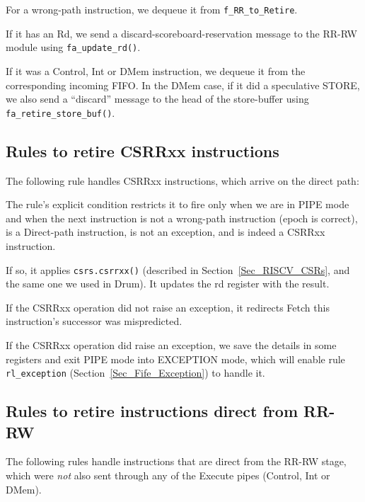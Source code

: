 For a wrong-path instruction, we dequeue it from \verb|f_RR_to_Retire|.

If it has an Rd, we send a discard-scoreboard-reservation message to
the RR-RW module using \verb|fa_update_rd()|.

If it was a Control, Int or DMem instruction, we dequeue it from the
corresponding incoming FIFO.  In the DMem case, if it did a
speculative STORE, we also send a ``discard'' message to the head of
the store-buffer using \verb|fa_retire_store_buf()|.




\subsection{Rules to retire CSRRxx instructions}

The following rule handles CSRRxx instructions, which arrive on the direct path:



The rule's explicit condition restricts it to fire only when we are in
PIPE mode and when the next instruction is not a wrong-path
instruction (epoch is correct), is a Direct-path instruction, is not
an exception, and is indeed a CSRRxx instruction.

If so, it applies \verb|csrs.csrrxx()| (described in
Section~\ref{Sec_RISCV_CSRs}, and the same one we used in Drum).  It
updates the rd register with the result.

If the CSRRxx operation did not raise an exception, it redirects Fetch
this instruction's successor was mispredicted.

If the CSRRxx operation did raise an exception, we save the details in
some registers and exit PIPE mode into EXCEPTION mode, which will
enable rule \verb|rl_exception| (Section~\ref{Sec_Fife_Exception}) to
handle it.


\subsection{Rules to retire instructions direct from RR-RW}

The following rules handle instructions that are direct from the RR-RW
stage, {\ie} which were \emph{not} also sent through any of the
Execute pipes (Control, Int or DMem).


